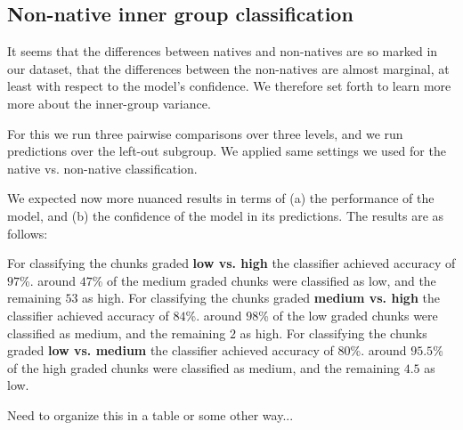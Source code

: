 \documentclass[11pt]{article}
\begin{document}
\subsection{Non-native inner group classification}
It seems that the differences between natives and non-natives are so marked in our dataset, that  the differences between the non-natives are almost marginal, at least with respect to the model's confidence. We therefore set forth to  learn more more about the inner-group variance.

For this we run three pairwise comparisons over three levels, and we run predictions over the left-out subgroup.
We  applied same settings we used for the native vs. non-native classification.

We expected now more nuanced results in terms of (a) the performance of the model, and (b) the confidence of the model in its predictions. The results are as follows: 

For classifying the chunks graded \textbf{low vs. high} the classifier achieved accuracy of $97$\%. around $47$\% of the medium graded chunks were classified as low, and the remaining $53$ as high.
For classifying the chunks graded \textbf{medium vs. high } the classifier achieved accuracy of $84$\%. around $98$\% of the low graded chunks were classified as medium, and the remaining $2$ as high.
For classifying the chunks graded \textbf{low vs. medium}  the classifier achieved accuracy of $80$\%. around $95.5$\% of the high graded chunks were classified as medium, and the remaining $4.5$ as low.

Need to organize this in a table or some other way... 



\end{document}
